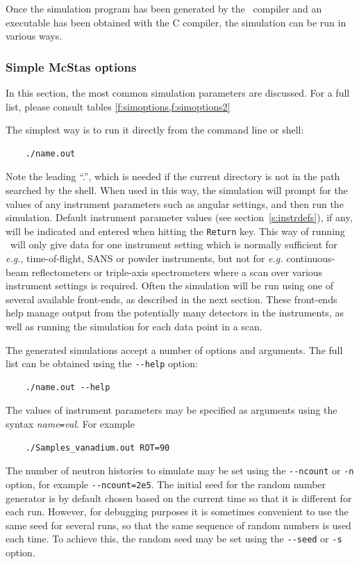 Once the simulation program has been generated by the \MCS\ compiler
and an executable has been obtained with the C compiler, the simulation
can be run in various ways.

\subsubsection{Simple McStas options}
In this section, the most common simulation parameters are
discussed. For a full list, please consult tables
\ref{f:simoptions,f:simoptions2}

The simplest way is to run it directly from the
command line or shell:
\begin{verbatim}
    ./name.out
\end{verbatim}
Note the leading ``.'', which is needed if the current directory is not in the
path searched by the shell. When used in this way, the simulation will prompt
for the values of any instrument parameters such as angular settings, and then
run the simulation. Default instrument parameter values (see
section~\ref{s:instrdefs}), if any, will be indicated and entered when hitting
the \verb+Return+ key. This way of
running \MCS\ will only give data for one instrument setting which is normally
sufficient for {\em e.g.}, time-of-flight, SANS or powder instruments, but not
for {\em e.g.} continuous-beam reflectometers or triple-axis spectrometers where
a scan over various instrument settings is required.  Often the simulation will
be run using one of several available front-ends, as described in the next
section. These front-ends help manage output from the potentially many detectors
in the instruments, as well as running the simulation for each data point in a
scan.

The generated simulations accept a number of options and arguments. The
full list can be obtained using the \verb+--help+ option:
\begin{verbatim}
    ./name.out --help
\end{verbatim}
The values of instrument parameters may be specified as arguments using
the syntax \textit{name}\verb+=+\textit{val}. For example
\begin{verbatim}
    ./Samples_vanadium.out ROT=90
\end{verbatim}
The number of neutron histories to simulate may be set using the
\verb+--ncount+ or \verb+-n+ option, for example
\verb+--ncount=2e5+. The initial seed for the random number generator is
by default chosen based on the current time so that it is different for
each run. However, for debugging purposes it is sometimes convenient to
use the same seed for several runs, so that the same sequence of random
numbers is used each time. To achieve this, the random seed may be set
using the \verb+--seed+ or \verb+-s+ option.

